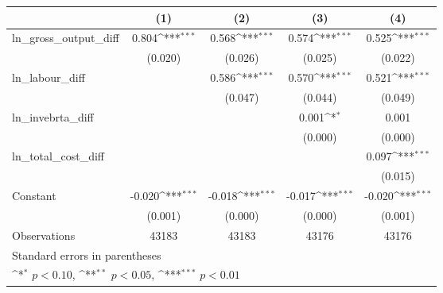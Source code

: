 {
\def\sym#1{\ifmmode^{#1}\else\(^{#1}\)\fi}
\begin{tabular}{l*{4}{c}}
\hline\hline
                &\multicolumn{1}{c}{(1)}         &\multicolumn{1}{c}{(2)}         &\multicolumn{1}{c}{(3)}         &\multicolumn{1}{c}{(4)}         \\
\hline
ln\_gross\_output\_diff&    0.804\sym{***}&    0.568\sym{***}&    0.574\sym{***}&    0.525\sym{***}\\
                &  (0.020)         &  (0.026)         &  (0.025)         &  (0.022)         \\
[1em]
ln\_labour\_diff  &                  &    0.586\sym{***}&    0.570\sym{***}&    0.521\sym{***}\\
                &                  &  (0.047)         &  (0.044)         &  (0.049)         \\
[1em]
ln\_invebrta\_diff&                  &                  &    0.001\sym{*}  &    0.001         \\
                &                  &                  &  (0.000)         &  (0.000)         \\
[1em]
ln\_total\_cost\_diff&                  &                  &                  &    0.097\sym{***}\\
                &                  &                  &                  &  (0.015)         \\
[1em]
Constant        &   -0.020\sym{***}&   -0.018\sym{***}&   -0.017\sym{***}&   -0.020\sym{***}\\
                &  (0.001)         &  (0.000)         &  (0.000)         &  (0.001)         \\
\hline
Observations    &    43183         &    43183         &    43176         &    43176         \\
\hline\hline
\multicolumn{5}{l}{\footnotesize Standard errors in parentheses}\\
\multicolumn{5}{l}{\footnotesize \sym{*} \(p<0.10\), \sym{**} \(p<0.05\), \sym{***} \(p<0.01\)}\\
\end{tabular}
}

